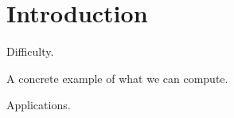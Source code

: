 \section{Introduction}
\label{sec:intro}

Difficulty. 

A concrete example of what we can compute. 

Applications. 

